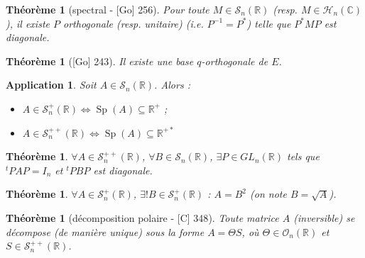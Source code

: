 \documentclass[10pt, a4paper, parskip=full, twoside, twocolumn]{report}
\newtheorem{theorem}[definition]{Théorème}
\newtheorem{application}[definition]{Application}
\newcommand{\IC}{\mathbb{C}}
\newcommand{\IR}{\mathbb{R}}
\DeclareMathOperator{\Sp}{Sp}
\begin{document}
\begin{tcolorbox}[
    breakable, %
    colback=developpement, %
    colframe=gray!0!black, %
    boxrule=0pt, %
    arc=1mm, %
	boxsep=0pt,
	left=0pt, right=0pt, top=0pt, bottom=0pt
]
\begin{theorem}[spectral - \textnormal{[Go] 256}]
	\label{157dev11}
	Pour toute $M\in\mathcal{S}_n(\IR)$ (resp. $M\in\mathcal{H}_n(\IC)$),
	il existe $P$ orthogonale (resp. unitaire) (\emph{i.e.} $P^{-1} = P^*$) telle que $P^*MP$ est diagonale.
\end{theorem}
\begin{theorem}[\textnormal{[Go] 243}]
	\label{157dev12}
	Il existe une base $q$-orthogonale de $E$.
\end{theorem}
\end{tcolorbox}

\begin{application}
	Soit $A\in\mathcal{S}_n(\IR)$. Alors :
	\begin{itemize}
		\item $A\in\mathcal{S}_n^+(\IR)\iff \Sp(A)\subseteq \IR^+$ ;
		\item $A\in\mathcal{S}_n^{++}(\IR) \iff \Sp(A)\subseteq \IR^{+*}$
	\end{itemize}
\end{application}

\begin{tcolorbox}[
    breakable, %
    colback=developpement, %
    colframe=gray!0!black, %
    boxrule=0pt, %
    arc=1mm, %
	boxsep=0pt,
	left=0pt, right=0pt, top=0pt, bottom=0pt
]
\begin{theorem}
	\label{157dev13}
	$\forall A\in \mathcal{S}_n^{++}(\IR)$, $\forall B\in \mathcal{S}_n(\IR)$, $\exists P\in GL_n(\IR)$ tels que 
	${}^tPAP=I_n$ et ${}^tPBP$ est diagonale.
\end{theorem}
\end{tcolorbox}

\begin{theorem}
	$\forall A\in \mathcal{S}_n^+(\IR)$, $\exists ! B\in\mathcal{S}_n^+(\IR)$ : $A=B^2$ (on note $B = \sqrt{A}$).
\end{theorem}

\begin{theorem}[décomposition polaire - \textnormal{[C] 348}]
	Toute matrice $A$ (inversible) se décompose (de manière unique)
	sous la forme $A=\Theta S$, où $\Theta\in \mathcal{O}_n(\IR)$ et $S\in\mathcal{S}_n^{++}(\IR)$.
\end{theorem}
\end{document}
